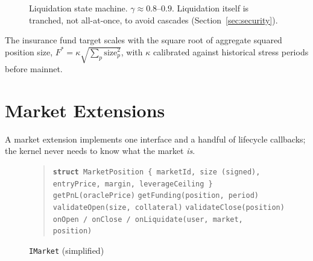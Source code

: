 \documentclass[11pt,a4paper]{article}
\begin{document}
\begin{figure}[h]
  \centering
  \caption{Liquidation state machine. $\gamma \approx 0.8$--$0.9$. Liquidation itself is tranched, not all-at-once, to avoid cascades (Section~\ref{sec:security}).}
  \label{fig:liquidation}
\end{figure}

The insurance fund target scales with the square root of aggregate squared position size, $F^* = \kappa\sqrt{\sum_p \text{size}_p^2}$, with $\kappa$ calibrated against historical stress periods before mainnet.

\section{Market Extensions}
\label{sec:markets}

A market extension implements one interface and a handful of lifecycle callbacks; the kernel never needs to know what the market \emph{is}.

\begin{figure}[h]
  \caption{\texttt{IMarket} (simplified)}
  \label{alg:market}
  \begin{quote}
  \texttt{\textbf{struct} MarketPosition \{ marketId, size (signed), entryPrice, margin, leverageCeiling \}} \\
  \texttt{getPnL(oraclePrice)} \quad \texttt{getFunding(position, period)} \\
  \texttt{validateOpen(size, collateral)} \quad \texttt{validateClose(position)} \\
  \texttt{onOpen / onClose / onLiquidate(user, market, position)}
  \end{quote}
\end{figure}
\end{document}
